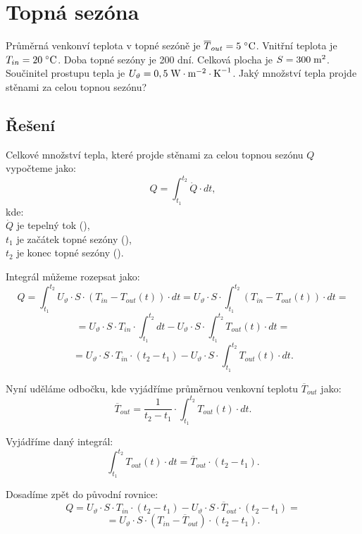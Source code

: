 \documentclass{article}
\begin{document}
\maketitle
\tableofcontents
\newpage




\section{ Topná sezóna \spicy \spicy \spicy}
Průměrná venkonví teplota v topné sezóně je $\overline{T}_{out} = 5 \; ^\circ \textrm{C}$. Vnitřní teplota je $T_{in} = 20 \; ^\circ \textrm{C}$. Doba topné sezóny je 200 dní. Celková plocha je $S = 300 \; \textrm{m}^{\textrm{2}}$. Součinitel prostupu tepla je $U_\vartheta = 0,5 \; \textrm{W} \cdot \textrm{m}^{-2} \cdot \textrm{K}^{-1}$. Jaký množství tepla projde stěnami za celou topnou sezónu?



\subsection{Řešení}
Celkové množství tepla, které projde stěnami za celou topnou sezónu $Q$ vypočteme jako:
$$
    Q = \int_{t_1}^{t_2} \dot{Q} \cdot dt,
$$
kde:\\
$\dot{Q}$ je tepelný tok (\ueqW),\\
$t_1$ je začátek topné sezóny (\uH),\\
$t_2$ je konec topné sezóny (\uH).

Integrál můžeme rozepsat jako:
$$
    Q = \int_{t_1}^{t_2} U_\vartheta \cdot S \cdot (T_{in} - T_{out} (t)) \cdot dt = U_\vartheta \cdot S \cdot \int_{t_1}^{t_2} (T_{in} - T_{out} (t)) \cdot dt =
$$
$$
    = U_\vartheta \cdot S \cdot T_{in} \cdot \int_{t_1}^{t_2} dt - U_\vartheta \cdot S \cdot \int_{t_1}^{t_2} T_{out} (t) \cdot dt =
$$
$$
    = U_\vartheta \cdot S \cdot T_{in} \cdot (t_2 - t_1) - U_\vartheta \cdot S \cdot \int_{t_1}^{t_2} T_{out} (t) \cdot dt.
$$

Nyní uděláme odbočku, kde vyjádříme průměrnou venkovní teplotu $\overline{T}_{out}$ jako:
$$
    \overline{T}_{out} = \frac{1}{t_2 - t_1} \cdot \int_{t_1}^{t_2} T_{out} (t) \cdot dt.
$$

Vyjádříme daný integrál:
$$
    \int_{t_1}^{t_2} T_{out} (t) \cdot dt = \overline{T}_{out} \cdot (t_2 - t_1).
$$

Dosadíme zpět do původní rovnice:
$$
    Q = U_\vartheta \cdot S \cdot T_{in} \cdot (t_2 - t_1) - U_\vartheta \cdot S \cdot \overline{T}_{out} \cdot (t_2 - t_1) =
$$
$$
    = U_\vartheta \cdot S \cdot (T_{in} - \overline{T}_{out}) \cdot (t_2 - t_1).
$$
\end{document}
